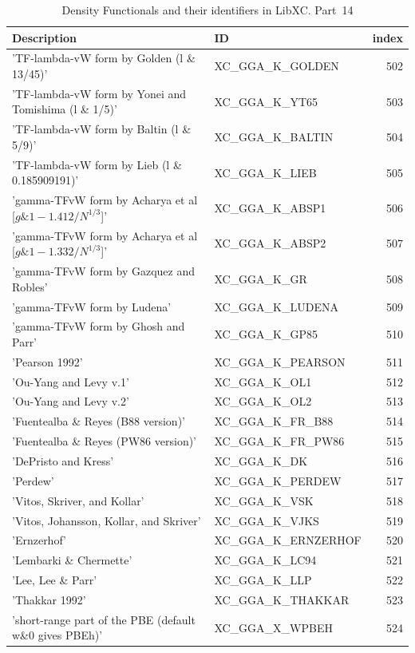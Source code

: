 \documentclass[final,12pt]{article}
\begin{document}
{{{{{{\begin{table}[!h]
\caption{Density Functionals and their identifiers in LibXC. Part~14}
\begin{center}
\begin{tabular}{llr}
\hline
\hline
Description & ID & index\\
\hline
  'TF-lambda-vW form by Golden (l \& 13/45)' & XC\_GGA\_K\_GOLDEN  &502\\
  'TF-lambda-vW form by Yonei and Tomishima (l \& 1/5)' & XC\_GGA\_K\_YT65  &503\\
  'TF-lambda-vW form by Baltin (l \& 5/9)' & XC\_GGA\_K\_BALTIN  &504\\
  'TF-lambda-vW form by Lieb (l \& 0.185909191)' & XC\_GGA\_K\_LIEB  &505\\
  'gamma-TFvW form by Acharya et al [$g \& 1 - 1.412/N^{1/3}$]' & XC\_GGA\_K\_ABSP1  &506\\
  'gamma-TFvW form by Acharya et al [$g \& 1 - 1.332/N^{1/3}$]' & XC\_GGA\_K\_ABSP2  &507\\
  'gamma-TFvW form by Gazquez and Robles' & XC\_GGA\_K\_GR  &508\\
  'gamma-TFvW form by Ludena' & XC\_GGA\_K\_LUDENA  &509\\
  'gamma-TFvW form by Ghosh and Parr' & XC\_GGA\_K\_GP85  &510\\
  'Pearson 1992' & XC\_GGA\_K\_PEARSON  &511\\
  'Ou-Yang and Levy v.1' & XC\_GGA\_K\_OL1  &512\\
  'Ou-Yang and Levy v.2' & XC\_GGA\_K\_OL2  &513\\
  'Fuentealba \& Reyes (B88 version)' & XC\_GGA\_K\_FR\_B88  &514\\
  'Fuentealba \& Reyes (PW86 version)' & XC\_GGA\_K\_FR\_PW86  &515\\
  'DePristo and Kress' & XC\_GGA\_K\_DK  &516\\
  'Perdew' & XC\_GGA\_K\_PERDEW  &517\\
  'Vitos, Skriver, and Kollar' & XC\_GGA\_K\_VSK  &518\\
  'Vitos, Johansson, Kollar, and Skriver' & XC\_GGA\_K\_VJKS  &519\\
  'Ernzerhof' & XC\_GGA\_K\_ERNZERHOF  &520\\
  'Lembarki \& Chermette' & XC\_GGA\_K\_LC94  &521\\
  'Lee, Lee \& Parr' & XC\_GGA\_K\_LLP  &522\\
  'Thakkar 1992' & XC\_GGA\_K\_THAKKAR  &523\\
  'short-range part of the PBE (default w\&0 gives PBEh)' & XC\_GGA\_X\_WPBEH  &524\\

\end{tabular}
\end{center}
\end{table}}}}}}}
\end{document}
